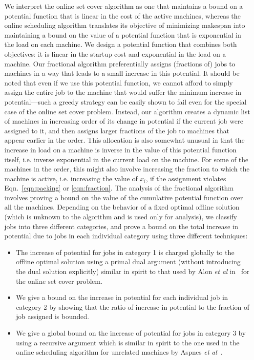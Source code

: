 \documentclass[11pt]{article}
\begin{document}
We interpret the online set cover algorithm as one that 
maintains a bound on a potential function that is linear in the cost of the 
active machines, whereas the online scheduling algorithm translates its 
objective of minimizing makespan into maintaining a bound on the value of 
a potential function that is exponential in the load on each machine. We 
design a potential function that combines both objectives: it is linear in
the startup cost and exponential in the load on a machine. Our fractional
algorithm preferentially assigns (fractions of) jobs to machines in a way that 
leads to a small increase in this potential. It should be noted that even 
if we use this potential function, we cannot afford to simply assign
the entire job  to the machine that would suffer the minimum increase in 
potential---such a 
greedy strategy can be easily shown to fail even for the special case of the
online set cover problem. Instead, our algorithm creates a dynamic list of 
machines in increasing order of its change in potential if the current job 
were assigned to it, and then assigns larger fractions of the job to 
machines that appear earlier in the order. 
This allocation is also somewhat unusual in that
the increase in load on a machine is inverse in the 
value of this potential function itself, i.e. inverse exponential in the
current load on the machine. For some of the machines in the
order, this might also involve increasing the fraction to which the machine
is active, i.e. increasing the value of $x_i$, if the assignment violates 
Eqn.~\ref{eqn:packing} or \ref{eqn:fraction}. The analysis of the fractional
algorithm involves proving a bound on the value of the cumulative
potential function over all the machines. Depending on the behavior of a
fixed optimal offline solution (which is unknown to the algorithm and is 
used only for analysis), we classify jobs into three different categories, and
prove a bound on the total increase in potential due to jobs in each individual
category using three different techniques:
\begin{itemize}
\item The increase of potential for jobs in category 1 is charged globally to 
the offline optimal solution using a primal dual argument (without introducing
the dual solution explicitly) similar in spirit to that used by Alon {\em et al} 
in~\cite{AlonAABN09} for the online set cover problem.
\item We give a bound on the increase in potential for each individual job in 
category 2 by showing that the ratio of increase in potential to the fraction
of job assigned is bounded.
\item We give a global bound on the increase of potential for jobs in category
3 by using a recursive argument which is similar in spirit 
to the one used in the online scheduling
algorithm for unrelated machines by Aspnes {\em et al}~\cite{AspnesAFPW97}.
\end{itemize}
\end{document}
